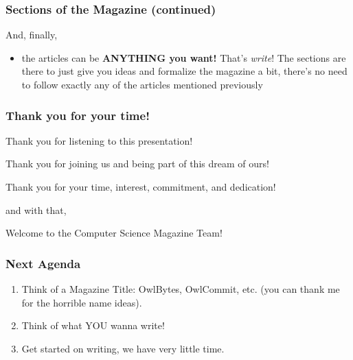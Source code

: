 \documentclass{beamer}
\begin{document}
\begin{frame}
    \frametitle{Sections of the Magazine (continued)}

        And, finally,

        \hspace{0.4pt}
        \pause
        
        \begin{itemize}

            \item<2-> the articles can be \textbf{ANYTHING you want!} That's \emph{write}! The sections are there to just give you ideas and formalize the magazine a bit, there's no need to follow exactly any of the articles mentioned previously

        \end{itemize}

\end{frame}




\begin{frame}
    \frametitle{Thank you for your time!}

    Thank you for listening to this presentation! 
    \pause

    Thank you for joining us and being part of this dream of ours!
    \pause

    Thank you for your time, interest, commitment, and dedication!
    \pause


    and with that,
    \pause

    \hspace{0.4pt}


    Welcome to the Computer Science Magazine Team! 
\end{frame}

\begin{frame}
    
    \frametitle{Next Agenda}

    \begin{enumerate}
        
        \item<1-> Think of a Magazine Title: OwlBytes, OwlCommit, etc. (you can thank me for the horrible name ideas).

        \item<2-> Think of what YOU wanna write!

        \item<3-> Get started on writing, we have very little time.

    \end{enumerate}

\end{frame}
\end{document}
